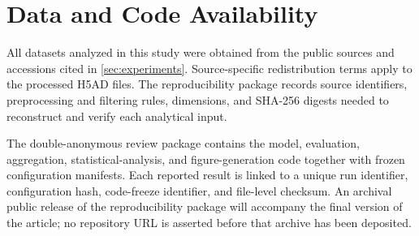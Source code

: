 \section{Data and Code Availability}
\label{sec:availability}

All datasets analyzed in this study were obtained from the public sources and
accessions cited in \cref{sec:experiments}. Source-specific redistribution
terms apply to the processed H5AD files. The reproducibility package records
source identifiers, preprocessing and filtering rules, dimensions, and SHA-256
digests needed to reconstruct and verify each analytical input.

The double-anonymous review package contains the model, evaluation, aggregation,
statistical-analysis, and figure-generation code together with frozen
configuration manifests.  Each reported result is linked to a unique run
identifier, configuration hash, code-freeze identifier, and file-level checksum.
An archival public release of the reproducibility package will accompany the
final version of the article; no repository URL is asserted before that archive
has been deposited.
